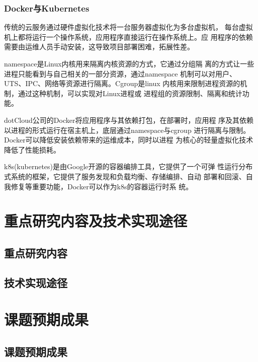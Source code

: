 \documentclass{article}
\begin{document}
\subsubsection{Docker与Kubernetes}
  传统的云服务通过硬件虚拟化技术将一台服务器虚拟化为多台虚拟机，
每台虚拟机上都将运行一个操作系统，应用程序直接运行在操作系统上。应
用程序的依赖需要由运维人员手动安装，这导致项目部署困难，拓展性差。

  namespace\cite{linuxNamespace}是Linux内核用来隔离内核资源的方式，它通过分组隔
离的方式让一些进程只能看到与自己相关的一部分资源，通过namespace
机制可以对用户、UTS、IPC、网络等资源进行隔离。Cgroup\cite{linuxCgroup}是linux
内核用来限制进程资源的机制，通过这种机制，可以实现对Linux进程或
进程组的资源限制、隔离和统计功能。
  
dotCloud公司的Docker将应用程序与其依赖打包，在部署时，应用程
序及其依赖以进程的形式运行在宿主机上，底层通过namespace与cgroup
进行隔离与限制。Docker可以降低安装依赖带来的运维成本，同时以进程
为核心的轻量虚拟化技术降低了性能损耗。
  
  k8s(kubernetes)是由Google开源的容器编排工具，它提供了一个可弹
性运行分布式系统的框架，它提供了服务发现和负载均衡、存储编排、自动
部署和回滚、自我修复等重要功能，Docker可以作为k8s的容器运行时系
统。

\section{重点研究内容及技术实现途径}

\subsection{重点研究内容}

\subsection{技术实现途径}


\section{课题预期成果}

\subsection{课题预期成果}
\end{document}
